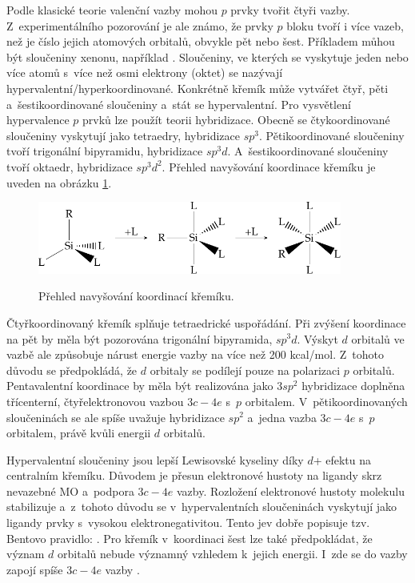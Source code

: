 \documentclass[
digital, %
table,   %
nolof,     %
nolot,     %
oneside,
]{fithesis3}
\begin{document}
Podle klasické teorie valenční vazby mohou $p$ prvky tvořit čtyři vazby. Z~experimentálního pozorování je ale známo, že prvky $p$ bloku tvoří i více vazeb, než je číslo jejich atomových orbitalů, obvykle pět nebo šest. Příkladem můhou být sloučeniny xenonu, například .
Sloučeniny, ve kterých se vyskytuje jeden nebo více atomů s~více než osmi elektrony (oktet) se nazývají hypervalentní/hyperkoordinované. Konkrétně křemík může vytvářet čtyř, pěti a~šestikoordinované sloučeniny a~stát se hypervalentní. Pro vysvětlení hypervalence $p$ prvků lze použít teorii hybridizace. Obecně se čtykoordinované sloučeniny vyskytují jako tetraedry, hybridizace $sp^3$. Pětikoordinované sloučeniny tvoří trigonální bipyramidu, hybridizace $sp^3d$. A~šestikoordinované sloučeniny tvoří oktaedr, hybridizace $sp^3d^2$. Přehled navyšování koordinace křemíku je uveden na obrázku \ref{prehled_koordinaci}.

\begin{figure}
\caption{Přehled navyšování koordinací křemíku.}
\center \includegraphics[width=10cm]{drawing.pdf} \label{prehled_koordinaci} \end{figure}

Čtyřkoordinovaný křemík splňuje tetraedrické uspořádání. Při zvýšení koordinace na pět by měla být pozorována trigonální bipyramida, $sp^3d$. Výskyt $d$ orbitalů ve vazbě ale způsobuje nárust energie vazby na více než 200 kcal/mol. Z~tohoto důvodu se předpokládá, že $d$ orbitaly se podílejí pouze na polarizaci $p$ orbitalů. Pentavalentní koordinace by měla být realizována jako $3sp^2$ hybridizace doplněna třícenterní, čtyřelektronovou vazbou $3c-4e$ s~$p$ orbitalem. V~pětikoordinovaných sloučeninách se ale spíše uvažuje hybridizace $sp^2$ a~jedna vazba $3c-4e$ s~$p$ orbitalem, právě kvůli energii $d$ orbitalů.

Hypervalentní sloučeniny jsou lepší Lewisovské kyseliny díky $d$+ efektu na centralním křemíku. Důvodem je přesun elektronové hustoty na ligandy skrz nevazebné MO a~podpora $3c-4e$ vazby. Rozložení elektronové hustoty molekulu stabilizuje a~z~tohoto důvodu se v~hypervalentních sloučeninách vyskytují jako ligandy prvky s~vysokou elektronegativitou. Tento jev dobře popisuje tzv. Bentovo pravidlo: \cite{hypervalentsiliconmacmillangroup2005}. Pro křemík v~koordinaci šest lze také předpokládat, že význam $d$ orbitalů nebude významný vzhledem k~jejich energii. I~zde se do vazby zapojí spíše $3c-4e$ vazby \cite{Wagler2014}.
\end{document}
